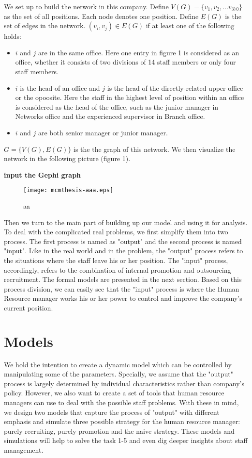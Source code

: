 \documentclass[tcn = 37075, sheet = true, abstract = true]{mcmthesis}
\begin{document}
We set up to build the network in this company. Define $V(G)=\{v_1,v_2,...v_{370}\}$ as the set of all positions. Each node denotes one position. Define $E(G)$ is the set of edges in the network. $(v_i,v_j)\in E(G)$ if at least one of the following holds:


\begin{itemize}
\item $i$ and $j$ are in the same office. Here one entry in figure 1 is considered as an office, whether it consists of two divisions of 14 staff members or only four staff members.
\item $i$ is the head of an office and $j$ is the head of the directly-related upper office or the opoosite. Here the staff in the highest level of position within an office is considered as the head of the office, such as the junior manager in Networks office and the experienced supervisor in Branch office.
\item $i$ and $j$ are both senior manager or junior manager.
\end{itemize}

$G=\{V(G),E(G)\}$ is the the graph of this network. We then visualize the network in the following picture (figure 1).

\textbf{input the Gephi graph}

\begin{figure}[htb!]
\small
\centering
\texttt{[image: mcmthesis-aaa.eps]}
\caption{aa} \label{fig:aa}
\end{figure}

Then we turn to the main part of building up our model and using it for analysis. To deal with the complicated real problems, we first simplify them into two process. The first process is named as "output" and the second process is named "input". Like in the real world and in the problem, the "output" process refers to the situations where the staff leave his or her position. The "input" process, accordingly, refers to the combination of internal promotion and outsourcing recruitment. The formal models are presented in the next section. Based on this process division, we can easily see that the "input" process is where the Human Resource manager works his or her power to control and improve the company's current position.


\section{Models}

We hold the intention to create a dynamic model which can be controlled by manipulating some of the parameters. Specially, we assume that the "output" process is largely determined by individual characteristics rather than company's policy. However, we also want to create a set of tools that human resource managers can use to deal with the possible staff problems. With these in mind, we design two models that capture the process of "output" with different emphasis and simulate three possible strategy for the human resource manager: purely recruiting, purely promotion and the naive strategy. These models and simulations will help to solve the task 1-5 and even dig deeper insights about staff management. 
\end{document}
